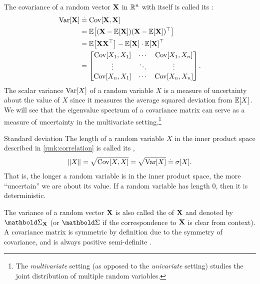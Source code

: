 The covariance of a random vector $\mathbf{X}$ in $\mathbb{R}^n$ with itself is called its : \begin{align}
  \Var{\rX} &\defeq \Cov{\rX, \rX} \\
  &= \E{(\rX - \E{\rX})\transpose{(\rX - \E{\rX})}} \label{eq:variance} \\
  &= \E{\rX \transpose{\rX}} - \E{\rX} \cdot \transpose{\E{\rX}} \label{eq:variance2} \\
  &= \begin{bmatrix}
    \Cov{X_1, X_1} & \cdots & \Cov{X_1, X_n} \\
    \vdots & \ddots & \vdots \\
    \Cov{X_n, X_1} & \cdots & \Cov{X_n, X_n} \\
  \end{bmatrix} \label{eq:covariance_matrix}.
\end{align}
The scalar variance $\Var{X}$ of a random variable $X$ is a measure of uncertainty about the value of $X$ since it measures the average squared deviation from $\E{X}$.
We will see that the eigenvalue spectrum of a covariance matrix can serve as a measure of uncertainty in the multivariate setting.\footnote{The \emph{multivariate} setting (as opposed to the \emph{univariate} setting) studies the joint distribution of multiple random variables.}

\begin{rmk}{Standard deviation}{}
  The length of a random variable $X$ in the inner product space described in \cref{rmk:correlation} is called its , \begin{align}
    \norm{X} = \sqrt{\Cov{X,X}} = \sqrt{\Var{X}} \eqdef \SD{X}.
  \end{align}
  That is, the longer a random variable is in the inner product space, the more ``uncertain'' we are about its value.
  If a random variable has length $0$, then it is deterministic.
\end{rmk}

The variance of a random vector $\mathbf{X}$ is also called the  of $\mathbf{X}$ and denoted by $\mSigma_{\rX}$ (or $\mSigma$ if the correspondence to $\mathbf{X}$ is clear from context).
A covariance matrix is symmetric by definition due to the symmetry of covariance, and is always positive semi-definite .

